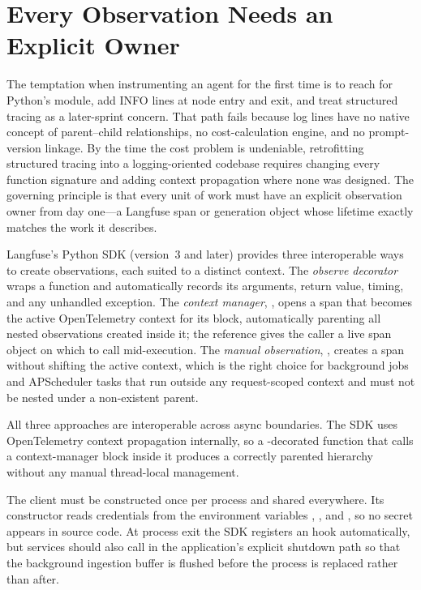 \section{Every Observation Needs an Explicit Owner}
\label{sec:obs-sdk-primitives}

The temptation when instrumenting an agent for the first time is to
reach for Python's  module, add INFO lines at node entry
and exit, and treat structured tracing as a later-sprint concern. That
path fails because log lines have no native concept of parent--child
relationships, no cost-calculation engine, and no prompt-version
linkage. By the time the cost problem is undeniable, retrofitting
structured tracing into a logging-oriented codebase requires changing
every function signature and adding context propagation where none was
designed. The governing principle is that every unit of work must have
an explicit observation owner from day one---a Langfuse span or
generation object whose lifetime exactly matches the work it describes.

Langfuse's Python SDK (version~3 and later) provides three interoperable
ways to create observations, each suited to a distinct context. The
\emph{observe decorator} wraps a function and automatically records its
arguments, return value, timing, and any unhandled exception.
The \emph{context manager}, ,
opens a span that becomes the active OpenTelemetry context for its
 block, automatically parenting all nested observations created
inside it; the  reference gives the caller a live span object
on which to call  mid-execution. The \emph{manual
observation}, , creates a span
without shifting the active context, which is the right choice for
background jobs and APScheduler tasks that run outside any
request-scoped context and must not be nested under a non-existent
parent.

All three approaches are interoperable across async boundaries. The SDK
uses OpenTelemetry context propagation internally, so a 
-decorated function that calls a context-manager block inside it produces
a correctly parented hierarchy without any manual thread-local management.

The  client must be constructed once per process and shared
everywhere. Its constructor reads credentials from the environment
variables , , and
, so no secret appears in source code. At process
exit the SDK registers an  hook automatically, but services
should also call  in the application's explicit
shutdown path so that the background ingestion buffer is flushed before
the process is replaced rather than after.

